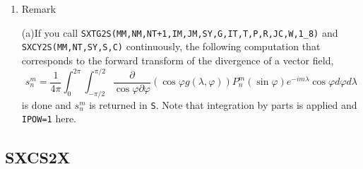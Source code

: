 \documentclass[a4paper]{scrartcl}
\begin{document}
\begin{enumerate}
\item Remark

  (a)If you call
  \texttt{SXTG2S(MM,NM,NT+1,IM,JM,SY,G,IT,T,P,R,JC,W,1\_8)} and\\
  \texttt{SXCY2S(MM,NT,SY,S,C)}
 continuously, 
    the following computation that corresponds to
    the forward transform of the divergence of a vector field,
\begin{equation}
s^m_n=\frac1{4\pi}\int^{2\pi}_0\int^{\pi/2}_{-\pi/2}
\frac{\partial}{\cos\varphi\partial\varphi}
\left(\cos\varphi g(\lambda,\varphi)\right)
P^m_n(\sin\varphi)
e^{-im\lambda}\cos\varphi d\varphi
d\lambda
\end{equation}
is done and $s^m_n$ is returned in \texttt{S}.
Note that integration by parts is applied and \texttt{IPOW=1} here.
    
\end{enumerate}


\subsection{SXCS2X}
\end{document}
